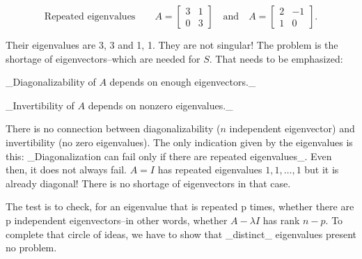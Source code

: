 \[\text{Repeated eigenvalues}\qquad A=\begin{bmatrix}3&1\\ 0&3\end{bmatrix}\quad\text{and}\quad A=\begin{bmatrix}2&-1\\ 1&0\end{bmatrix}.\]

Their eigenvalues are 3, 3 and 1, 1. They are not singular! The problem is the shortage of eigenvectors--which are needed for \(S\). That needs to be emphasized:

_Diagonalizability of \(A\) depends on enough eigenvectors._

_Invertibility of \(A\) depends on nonzero eigenvalues._

There is no connection between diagonalizability (\(n\) independent eigenvector) and invertibility (no zero eigenvalues). The only indication given by the eigenvalues is this: _Diagonalization can fail only if there are repeated eigenvalues_. Even then, it does not always fail. \(A=I\) has repeated eigenvalues \(1,1,\ldots,1\) but it is already diagonal! There is no shortage of eigenvectors in that case.

The test is to check, for an eigenvalue that is repeated p times, whether there are p independent eigenvectors--in other words, whether \(A-\lambda I\) has rank \(n-p\). To complete that circle of ideas, we have to show that _distinct_ eigenvalues present no problem.

 